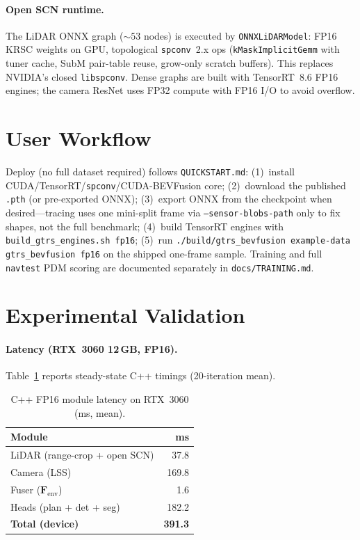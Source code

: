 \documentclass[twoside,11pt]{article}
\begin{document}
\paragraph{Open SCN runtime.}
The LiDAR ONNX graph (${\sim}53$ nodes) is executed by \texttt{ONNXLiDARModel}: FP16 KRSC weights on GPU, topological \texttt{spconv}~2.x ops (\texttt{kMaskImplicitGemm} with tuner cache, SubM pair-table reuse, grow-only scratch buffers). This replaces NVIDIA's closed \texttt{libspconv}. Dense graphs are built with TensorRT~8.6 FP16 engines; the camera ResNet uses FP32 compute with FP16 I/O to avoid overflow.

\section{User Workflow}
\label{sec:workflow}

Deploy (no full dataset required) follows \texttt{QUICKSTART.md}:
(1)~install CUDA/TensorRT/\texttt{spconv}/CUDA-BEVFusion core;
(2)~download the published \texttt{.pth} (or pre-exported ONNX);
(3)~export ONNX from the checkpoint when desired---tracing uses one mini-split frame via \texttt{--sensor-blobs-path} only to fix shapes, not the full benchmark;
(4)~build TensorRT engines with \texttt{build\_gtrs\_engines.sh fp16};
(5)~run \texttt{./build/gtrs\_bevfusion example-data gtrs\_bevfusion fp16} on the shipped one-frame sample.
Training and full \texttt{navtest} PDM scoring are documented separately in \texttt{docs/TRAINING.md}.

\section{Experimental Validation}
\label{sec:exp}

\paragraph{Latency (RTX~3060 12\,GB, FP16).}
Table~\ref{tab:latency} reports steady-state C++ timings (20-iteration mean).

\begin{table}[H]
  \caption{C++ FP16 module latency on RTX~3060 (ms, mean).}
  \label{tab:latency}
  \centering
  \begin{tabular}{lr}
    \toprule
    Module & ms \\
    \midrule
    LiDAR (range-crop + open SCN) & 37.8 \\
    Camera (LSS)                  & 169.8 \\
    Fuser ($\mathbf{F}_{\mathrm{env}}$) & 1.6 \\
    Heads (plan + det + seg)      & 182.2 \\
    \midrule
    \textbf{Total (device)}       & \textbf{391.3} \\
    \bottomrule
  \end{tabular}
\end{table}
\end{document}

